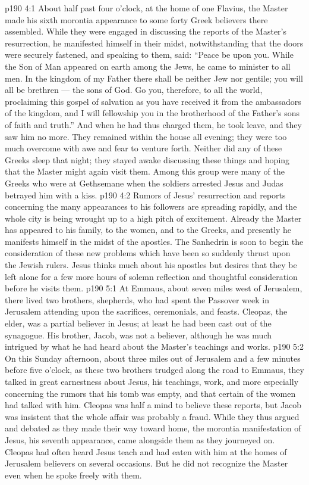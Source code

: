 \vs p190 4:1 About half past four o’clock, at the home of one Flavius, the Master made his sixth morontia appearance to some forty Greek believers there assembled. While they were engaged in discussing the reports of the Master’s resurrection, he manifested himself in their midst, notwithstanding that the doors were securely fastened, and speaking to them, said: \textcolor{ubdarkred}{“Peace be upon you. While the Son of Man appeared on earth among the Jews, he came to minister to all men. In the kingdom of my Father there shall be neither Jew nor gentile; you will all be brethren --- the sons of God. Go you, therefore, to all the world, proclaiming this gospel of salvation as you have received it from the ambassadors of the kingdom, and I will fellowship you in the brotherhood of the Father’s sons of faith and truth.”} And when he had thus charged them, he took leave, and they saw him no more. They remained within the house all evening; they were too much overcome with awe and fear to venture forth. Neither did any of these Greeks sleep that night; they stayed awake discussing these things and hoping that the Master might again visit them. Among this group were many of the Greeks who were at Gethsemane when the soldiers arrested Jesus and Judas betrayed him with a kiss.
\vs p190 4:2 \pc Rumors of Jesus’ resurrection and reports concerning the many appearances to his followers are spreading rapidly, and the whole city is being wrought up to a high pitch of excitement. Already the Master has appeared to his family, to the women, and to the Greeks, and presently he manifests himself in the midst of the apostles. The Sanhedrin is soon to begin the consideration of these new problems which have been so suddenly thrust upon the Jewish rulers. Jesus thinks much about his apostles but desires that they be left alone for a few more hours of solemn reflection and thoughtful consideration before he visits them.
\vs p190 5:1 At Emmaus, about seven miles west of Jerusalem, there lived two brothers, shepherds, who had spent the Passover week in Jerusalem attending upon the sacrifices, ceremonials, and feasts. Cleopas, the elder, was a partial believer in Jesus; at least he had been cast out of the synagogue. His brother, Jacob, was not a believer, although he was much intrigued by what he had heard about the Master’s teachings and works.
\vs p190 5:2 On this Sunday afternoon, about three miles out of Jerusalem and a few minutes before five o’clock, as these two brothers trudged along the road to Emmaus, they talked in great earnestness about Jesus, his teachings, work, and more especially concerning the rumors that his tomb was empty, and that certain of the women had talked with him. Cleopas was half a mind to believe these reports, but Jacob was insistent that the whole affair was probably a fraud. While they thus argued and debated as they made their way toward home, the morontia manifestation of Jesus, his seventh appearance, came alongside them as they journeyed on. Cleopas had often heard Jesus teach and had eaten with him at the homes of Jerusalem believers on several occasions. But he did not recognize the Master even when he spoke freely with them.
